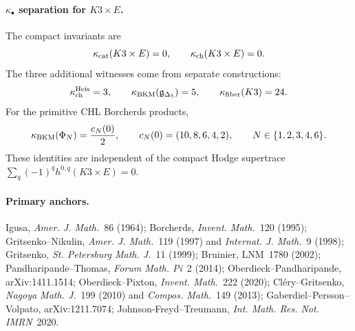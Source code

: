 \paragraph{\(\kappa_\bullet\) separation for \(K3\times E\).}
The compact invariants are
\[
        \kappa_{\mathrm{cat}}(K3\times E)=0,\qquad
        \kappa_{\mathrm{ch}}(K3\times E)=0.
\]
The three additional witnesses come from separate constructions:
\[
        \kappa_{\mathrm{ch}}^{\mathrm{Heis}}=3,\qquad
        \kappa_{\mathrm{BKM}}(\mathfrak g_{\Delta_5})=5,\qquad
        \kappa_{\mathrm{fiber}}(K3)=24 .
\]
For the primitive CHL Borcherds products,
\[
        \kappa_{\mathrm{BKM}}(\Phi_N)=\frac{c_N(0)}2,\qquad
        c_N(0)=(10,8,6,4,2),\qquad
        N\in\{1,2,3,4,6\}.
\]
These identities are independent of the compact Hodge supertrace
\(\sum_q(-1)^qh^{0,q}(K3\times E)=0\).

\paragraph{Primary anchors.}
Igusa, \emph{Amer. J. Math.}~86 (1964); Borcherds, \emph{Invent.
Math.}~120 (1995); Gritsenko--Nikulin, \emph{Amer. J. Math.}~119 (1997)
and \emph{Internat. J. Math.}~9 (1998); Gritsenko, \emph{St. Petersburg
Math. J.}~11 (1999); Bruinier, LNM~1780 (2002);
Pandharipande--Thomas, \emph{Forum Math. Pi}~2 (2014);
Oberdieck--Pandharipande, arXiv:1411.1514; Oberdieck--Pixton,
\emph{Invent. Math.}~222 (2020); Cl\'ery--Gritsenko, \emph{Nagoya Math.
J.}~199 (2010) and \emph{Compos. Math.}~149 (2013);
Gaberdiel--Persson--Volpato, arXiv:1211.7074; Johnson-Freyd--Treumann,
\emph{Int. Math. Res. Not. IMRN}~2020.

